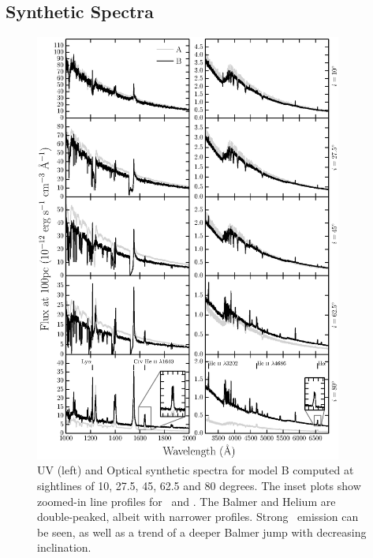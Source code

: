 \documentclass[preprint, a4paper, 11pt]{aastex}
\begin{document}
\subsection{Synthetic Spectra}

\begin{figure} %
\includegraphics[width=0.9\textwidth]{figures/modelb_uv_opt.eps}
\caption{
UV (left) and Optical synthetic spectra for model B computed at
sightlines of 10, 27.5, 45, 62.5 and 80 degrees.	
The inset plots show zoomed-in line profiles for 
\heiiuv\ and \ha. The Balmer and Helium
are double-peaked, albeit with narrower profiles.
Strong \heiiopt\ emission can be seen, as well as a trend
of a deeper Balmer jump with decreasing inclination.
}
\label{uvoptb}
\end{figure} %
\end{document}
